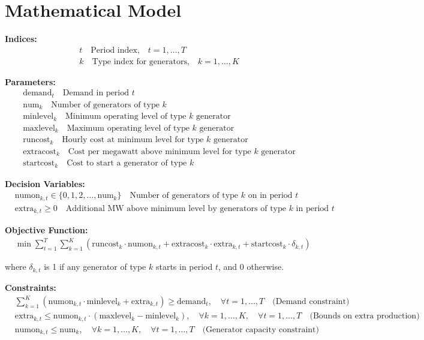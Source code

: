 \documentclass{article}
\begin{document}
\section*{Mathematical Model}

\textbf{Indices:}
\begin{align*}
&t \quad \text{Period index,} \quad t = 1, \ldots, T \\
&k \quad \text{Type index for generators,} \quad k = 1, \ldots, K
\end{align*}

\textbf{Parameters:}
\begin{align*}
&\text{demand}_t \quad \text{Demand in period } t \\
&\text{num}_k \quad \text{Number of generators of type } k \\
&\text{minlevel}_k \quad \text{Minimum operating level of type } k \text{ generator} \\
&\text{maxlevel}_k \quad \text{Maximum operating level of type } k \text{ generator} \\
&\text{runcost}_k \quad \text{Hourly cost at minimum level for type } k \text{ generator} \\
&\text{extracost}_k \quad \text{Cost per megawatt above minimum level for type } k \text{ generator} \\
&\text{startcost}_k \quad \text{Cost to start a generator of type } k
\end{align*}

\textbf{Decision Variables:}
\begin{align*}
&\text{numon}_{k,t} \in \{0, 1, 2, \ldots, \text{num}_k\} \quad \text{Number of generators of type } k \text{ on in period } t \\
&\text{extra}_{k,t} \geq 0 \quad \text{Additional MW above minimum level by generators of type } k \text{ in period } t
\end{align*}

\textbf{Objective Function:}
\begin{align*}
&\min \sum_{t=1}^{T} \sum_{k=1}^{K} \left( \text{runcost}_k \cdot \text{numon}_{k,t} + \text{extracost}_k \cdot \text{extra}_{k,t} + \text{startcost}_k \cdot \delta_{k,t} \right)
\end{align*}

where \( \delta_{k,t} \) is 1 if any generator of type \( k \) starts in period \( t \), and 0 otherwise.

\textbf{Constraints:}
\begin{align*}
&\sum_{k=1}^{K} \left( \text{numon}_{k,t} \cdot \text{minlevel}_k + \text{extra}_{k,t} \right) \geq \text{demand}_t, \quad \forall t = 1, \ldots, T \quad \text{(Demand constraint)}\\
&\text{extra}_{k,t} \leq \text{numon}_{k,t} \cdot (\text{maxlevel}_k - \text{minlevel}_k), \quad \forall k = 1, \ldots, K, \quad \forall t = 1, \ldots, T \quad \text{(Bounds on extra production)} \\
&\text{numon}_{k,t} \leq \text{num}_k, \quad \forall k = 1, \ldots, K, \quad \forall t = 1, \ldots, T \quad \text{(Generator capacity constraint)}
\end{align*}
\end{document}
